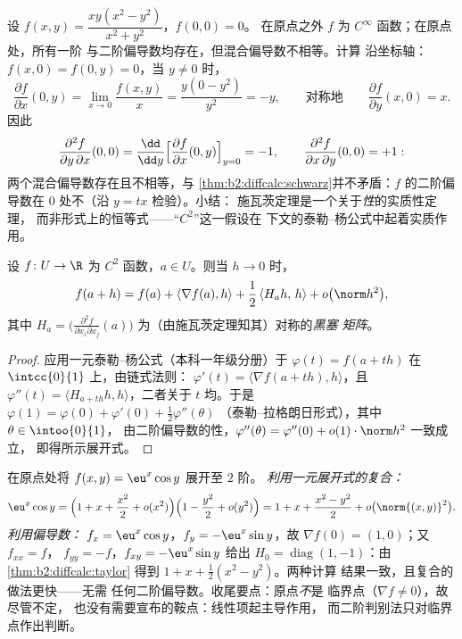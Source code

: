 \begin{example}\label{ex:b2:diffcalc:peano}
设 $f(x, y) = \dfrac{xy(x^2 - y^2)}{x^2 + y^2}$，$f(0,0) = 0$。
在原点之外 $f$ 为 $C^\infty$ 函数；在原点处，所有一阶
与二阶偏导数均存在，但混合偏导数不相等。计算
沿坐标轴：$f(x, 0) = f(0, y) = 0$，当 $y \neq 0$ 时，
\[
\frac{\partial f}{\partial x}(0, y)
= \lim_{x\to0}\frac{f(x,y)}{x}
= \frac{y(0 - y^2)}{y^2} = -y ,
\qquad\text{对称地}\qquad
\frac{\partial f}{\partial y}(x, 0) = x .
\]
因此
\[
\frac{\partial^2 f}{\partial y\,\partial x}(0,0)
= \frac{\dd}{\dd y}\Bigl[\frac{\partial f}{\partial
x}(0,y)\Bigr]_{y=0} = -1,
\qquad
\frac{\partial^2 f}{\partial x\,\partial y}(0,0) = +1 :
\]
两个混合偏导数存在且不相等，与
\cref{thm:b2:diffcalc:schwarz}并不矛盾：$f$ 的二阶偏导数在
$0$ 处不（沿 $y = tx$ 检验）。小结：
施瓦茨定理是一个关于\emph{性}的实质性定理，
而非形式上的恒等式——“$C^2$”这一假设在
下文的泰勒--杨公式中起着实质作用。
\end{example}

\begin{theorem}\label{thm:b2:diffcalc:taylor}
设 $f \colon U \to \R$ 为 $C^2$ 函数，$a \in U$。则当 $h \to 0$ 时，
\[
f(a + h) = f(a) + \langle\nabla f(a), h\rangle
+ \frac12\, \langle H_a h,\, h\rangle + o\bigl(\norm h^2\bigr),
\]
其中 $H_a = \bigl(\frac{\partial^2 f}{\partial x_i\partial
x_j}(a)\bigr)$ 为（由施瓦茨定理知其）对称的\emph{黑塞
矩阵}。
\end{theorem}

\begin{proof}
应用一元泰勒--杨公式（本科一年级分册）于
$\varphi(t) = f(a + th)$ 在 $\intcc{0}{1}$ 上，由链式法则：
$\varphi'(t) = \langle \nabla f(a + th), h\rangle$，且 $\varphi''(t)
= \langle H_{a+th}h, h\rangle$，二者关于 $t$ 均。于是
$\varphi(1) = \varphi(0) + \varphi'(0) + \frac12\varphi''(\theta)$
（泰勒--拉格朗日形式），其中 $\theta \in \intoo{0}{1}$，
由二阶偏导数的性，$\varphi''(\theta) =
\varphi''(0) + o(1)\cdot\norm h^2$ 一致成立，
即得所示展开式。
\end{proof}

\begin{example}[两种方式展开]\label{ex:b2:diffcalc:taylortwoways}
在原点处将 $f(x, y) = \eu^x\cos y$ 展开至 $2$ 阶。
\emph{利用一元展开式的复合：}
\[
\eu^x\cos y = \Bigl(1 + x + \frac{x^2}{2} +
o(x^2)\Bigr)\Bigl(1 - \frac{y^2}{2} + o(y^2)\Bigr)
= 1 + x + \frac{x^2 - y^2}{2} + o\bigl(\norm{(x,y)}^2\bigr) .
\]
\emph{利用偏导数：} $f_x = \eu^x\cos y$，$f_y =
-\eu^x\sin y$，故 $\nabla f(0) = (1, 0)$；又 $f_{xx} = f$，
$f_{yy} = -f$，$f_{xy} = -\eu^x\sin y$ 给出 $H_0 =
\operatorname{diag}(1, -1)$：由\cref{thm:b2:diffcalc:taylor}
得到 $1 + x + \frac12(x^2 - y^2)$。两种计算
结果一致，且复合的做法更快——无需
任何二阶偏导数。收尾要点：原点\emph{不}是
临界点（$\nabla f \neq 0$），故尽管不定，
也没有需要宣布的鞍点：线性项起主导作用，
而二阶判别法只对临界
点作出判断。
\end{example}

